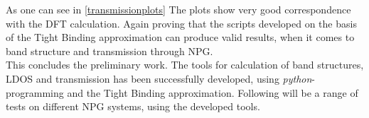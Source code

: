 As one can see in \cref{transmissionplots} The plots show very good correspondence with the DFT calculation. Again proving that the scripts developed on the basis of the Tight Binding approximation can produce valid results, when it comes to band structure and transmission through NPG.\\
This concludes the preliminary work. The tools for calculation of band structures, LDOS and transmission has been successfully developed, using \textit{python}-programming and the Tight Binding approximation. Following will be a range of tests on different NPG systems, using the developed tools. 
